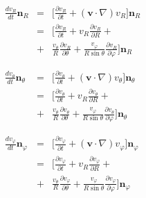 \begin{solution}
\begin{enumerate}
\begin{multicols}{2}
\begin{eqnarray}
\frac{d v_R}{dt}\mathbf{n}_R & = &
   \Big[
       \frac{\partial v_R}{\partial t} + (\mathbf{v}\cdot\nabla)v_R
   \Big]\mathbf{n}_R\nonumber\\
   & = &
   \Big[
       \frac{\partial v_R}{\partial t} +
       v_R\frac{\partial v_R}{\partial R} +\nonumber\\
   & + & \frac{v_\theta}{R}\frac{\partial v_R}{\partial\theta}+\frac{v_\varphi}{R\sin\theta}\frac{\partial v_R}{\partial\varphi}
   \Big]\mathbf{n}_R
   \nonumber\\
   \nonumber\\
   \nonumber\\
   \frac{d v_\theta}{dt}\mathbf{n}_\theta & = &
   \Big[
       \frac{\partial v_\theta}{\partial t} + (\mathbf{v}\cdot\nabla)v_\theta
   \Big]\mathbf{n}_\theta\nonumber\\
   & = &
   \Big[
       \frac{\partial v_\theta}{\partial t} +
       v_R\frac{\partial v_\theta}{\partial R} +\nonumber\\
   & + & \frac{v_\theta}{R}\frac{\partial v_\theta}{\partial\theta}+\frac{v_\varphi}{R\sin\theta}\frac{\partial v_\theta}{\partial\varphi}
   \Big]\mathbf{n}_\theta
      \nonumber\\
   \nonumber\\
   \nonumber\\
\frac{d v_\varphi}{dt}\mathbf{n}_\varphi & = &
   \Big[
       \frac{\partial v_\varphi}{\partial t} + (\mathbf{v}\cdot\nabla)v_\varphi
   \Big]\mathbf{n}_\varphi\nonumber\\
   & = &
   \Big[
       \frac{\partial v_\varphi}{\partial t} +
       v_R\frac{\partial v_\varphi}{\partial R} +\nonumber\\
   & + & \frac{v_\theta}{R}\frac{\partial v_\varphi}{\partial\theta}+\frac{v_\varphi}{R\sin\theta}\frac{\partial v_\varphi}{\partial\varphi}
   \Big]\mathbf{n}_\varphi
      \nonumber\\
   \nonumber\\
   \nonumber
\end{eqnarray}
\end{multicols}


\end{enumerate}
\end{solution}
